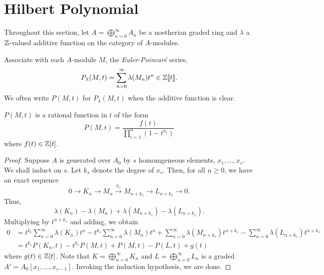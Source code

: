 \section{Hilbert Polynomial}

Throughout this section, let $A = \bigoplus_{n = 0}^\infty A_n$ be a noetherian graded ring and $\lambda$ a $\mathbb{Z}$-valued additive function on the category of $A$-modules.

\begin{definition}
    Associate with each $A$-module $M$, the \emph{Euler-Poincar\'e} series, 
    \begin{equation*}
        P_\lambda(M, t) = \sum_{n = 0}^\infty\lambda(M_n)t^n\in\mathbb{Z}\llbracket t\rrbracket.
    \end{equation*}
    We often write $P(M, t)$ for $P_\lambda(M, t)$ when the additive function is clear.
\end{definition}

\begin{theorem}
    $P(M, t)$ is a rational function in $t$ of the form 
    \begin{equation*}
        P(M, t) = \frac{f(t)}{\prod_{i = 1}^n (1 - t^{n_i})}
    \end{equation*}
    where $f(t)\in\mathbb{Z}[t]$.
\end{theorem}
\begin{proof}
    Suppose $A$ is generated over $A_0$ by $s$ homomgeneous elements, $x_1,\dots,x_s$. We shall induct on $s$. Let $k_s$ denote the degree of $x_s$. Then, for all $n\ge 0$, we have an exact sequence 
    \begin{equation*}
        0\rightarrow K_n\rightarrow M_n\xrightarrow{x_s} M_{n + k_s}\rightarrow L_{n + k_s}\rightarrow 0.
    \end{equation*}
    Thus, 
    \begin{equation*}
        \lambda(K_n) - \lambda(M_n) + \lambda(M_{n + k_s}) - \lambda(L_{n + k_s}).
    \end{equation*}
    Multiplying by $t^{n + k_s}$ and adding, we obtain 
    \begin{align*}
        0 &= t^{k_s}\sum_{n = 0}^\infty\lambda(K_n)t^n - t^{k_s}\sum_{n = 0}^\infty\lambda(M_n)t^n + \sum_{n = 0}^\infty\lambda(M_{n + k_s})t^{n + k_s} - \sum_{n = 0}^\infty\lambda(L_{n + k_s})t^{n + k_s}\\
        &= t^{k_s}P(K_n , t) - t^{k_s}P(M, t) + P(M, t) - P(L, t) + g(t)
    \end{align*}
    where $g(t)\in\mathbb{Z}[t]$. Note that $K = \bigoplus_{n = 0}^\infty K_n$ and $L = \bigoplus_{n = 0}^\infty L_n$ is a graded $A' = A_0[x_1,\dots,x_{s - 1}]$. Invoking the induction hypothesis, we are done.
\end{proof}

